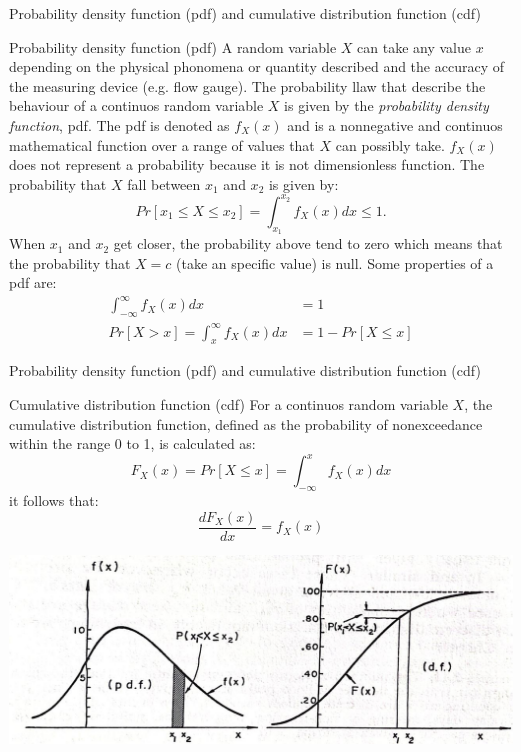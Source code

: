 \documentclass[8pt]{beamer}
\begin{document}
\begin{frame}{Probability density function (pdf) and cumulative distribution function (cdf)} 
    
    \begin{block}{Probability density function (pdf)} 
        A random variable $X$  can take any value $x$ depending on the physical phonomena or quantity described and the accuracy of the measuring device (e.g. flow gauge). The probability llaw that describe the behaviour of a continuos random variable $X$ is given by the \emph{probability density function}, pdf. The pdf is denoted as $f_X (x)$ and is a nonnegative and continuos mathematical function over a range of values that $X$ can possibly take. $f_X (x)$ does not represent a probability because it is not dimensionless function. The probability that $X$ fall between $x_1$ and $x_2$ is given by:
        $$
        Pr[x_1 \leq X \leq x_2] = \int_{x_1}^{x_2} f_X (x) dx \leq 1.
        $$
        When $x_1$ and $x_2$ get closer, the probability above tend to zero which means that the probability that $X = c$ (take an specific value) is null. Some properties of a pdf are:
        \begin{align*}
            \int_{-\infty}^{\infty} f_X (x) dx &= 1 \\
            Pr[X > x] = \int_{x}^{\infty} f_X (x) dx &= 1- Pr[X \leq x]
        \end{align*}
    \end{block}
\end{frame}

\begin{frame}{Probability density function (pdf) and cumulative distribution function (cdf)} 
    \begin{block}{Cumulative distribution function (cdf)} 
        For a continuos random variable $X$, the cumulative distribution function, defined as the probability of nonexceedance within the range 0 to 1, is calculated as:
        \vspace{-9pt}
        $$
        F_X (x) = Pr[X \leq x] = \int_{-\infty}^{x} f_X (x) dx
        $$
        it follows that:
        $$
        \frac{d F_X (x)}{dx} = f_X (x)
        $$
    \end{block}
            \includegraphics[width=\linewidth]{fiV23.jpeg} %
\end{frame}
\end{document}
